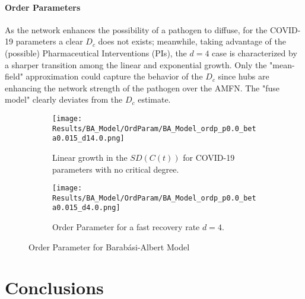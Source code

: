 \documentclass[a4paper,10pt,twoside]{book} %
\theoremstyle{definition}
\begin{document}
\subsubsection*{Order Parameters}
As the network enhances the possibility of a pathogen to diffuse, for the COVID-19 parameters a clear $D_c$ does not exists; meanwhile, taking advantage of the (possible) Pharmaceutical Interventions (PIs), the $d = 4$ case is characterized by a sharper transition among the linear and exponential growth. Only the "mean-field" approximation could capture the behavior of the $ D_c$ since hubs are enhancing the network strength of the pathogen over the AMFN. The "fuse model" clearly deviates from the $ D_c$ estimate. 
\begin{figure}[t]
	\begin{subfigure}[t]{0.48\linewidth}
		\centering
		\texttt{[image: Results/BA\_Model/OrdParam/BA\_Model\_ordp\_p0.0\_beta0.015\_d14.0.png]}
		\caption{Linear growth in the $SD(C(t))$ for COVID-19 parameters with no critical degree.}
		\label{fig:Ordp_BA_d14}
	\end{subfigure}
	\hfill
	\begin{subfigure}[t]{0.48\linewidth}
		\centering
		\texttt{[image: Results/BA\_Model/OrdParam/BA\_Model\_ordp\_p0.0\_beta0.015\_d4.0.png]}
		\caption{Order Parameter for a fast recovery rate $ d = 4$.}
		\label{fig:Ordp_BA_COVID_d1}
	\end{subfigure}
	\caption{Order Parameter for Barabási-Albert Model}
	\label{fig:Ordp_BA_COVID}
\end{figure}


\chapter{Conclusions}
\end{document}
